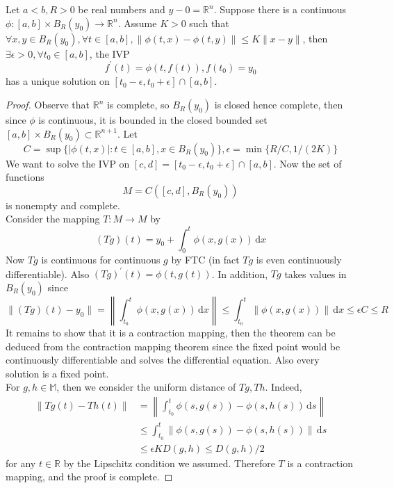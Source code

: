 \begin{theorem}
    Let $a<b, R>0$ be real numbers and $y-0=\mathbb R^n$.
    Suppose there is a continuous $\phi:[a,b]\times B_R(y_0)\to \mathbb R^n$.
    Assume $K>0$ such that $\forall x,y\in B_R(y_0),\forall t\in [a,b],\|\phi(t,x)-\phi(t,y)\|\le K\|x-y\|$, then $\exists\epsilon>0,\forall t_0\in [a,b]$, the IVP
    $$f^\prime(t)=\phi(t,f(t)),f(t_0)=y_0$$
    has a unique solution on $[t_0-\epsilon,t_0+\epsilon]\cap [a,b]$.
\end{theorem}
\begin{proof}
    Observe that $\mathbb R^n$ is complete, so $B_R(y_0)$ is closed hence complete, then since $\phi$ is continuous, it is bounded in the closed bounded set $[a,b]\times B_R(y_0)\subset\mathbb R^{n+1}$.
    Let
    $$C=\sup\{|\phi(t,x)|:t\in [a,b],x\in B_R(y_0)\},\epsilon=\min\{R/C,1/(2K)\}$$
    We want to solve the IVP on $[c,d]=[t_0-\epsilon,t_0+\epsilon]\cap[a,b]$.
    Now the set of functions
    $$M=C([c,d],B_R(y_0))$$
    is nonempty and complete.\\
    Consider the mapping $T:M\to M$ by
    $$(Tg)(t)=y_0+\int_0^t\phi(x, g(x))\,\mathrm dx$$
    Now $Tg$ is continuous for continuous $g$ by FTC (in fact $Tg$ is even continuously differentiable).
    Also $(Tg)^\prime(t)=\phi(t,g(t))$.
    In addition, $Tg$ takes values in $B_R(y_0)$ since
    $$\|(Tg)(t)-y_0\|=\left\|\int_{t_0}^t\phi(x, g(x))\,\mathrm dx\right\|\le\int_{t_0}^t\|\phi(x, g(x))\|\,\mathrm dx\le \epsilon C\le R$$
    It remains to show that it is a contraction mapping, then the theorem can be deduced from the contraction mapping theorem since the fixed point would be continuously differentiable and solves the differential equation.
    Also every solution is a fixed point.\\
    For $g,h\in\mathbb M$, then we consider the uniform distance of $Tg,Th$.
    Indeed,
    \begin{align*}
        \|Tg(t)-Th(t)\|&=\left\|\int_{t_0}^t\phi(s,g(s))-\phi(s,h(s))\,\mathrm ds\right\|\\
        &\le\int_{t_0}^t\|\phi(s,g(s))-\phi(s,h(s))\|\,\mathrm ds\\
        &\le\epsilon KD(g,h)\le D(g,h)/2
    \end{align*}
    for any $t\in\mathbb R$ by the Lipschitz condition we assumed.
    Therefore $T$ is a contraction mapping, and the proof is complete.
\end{proof}

